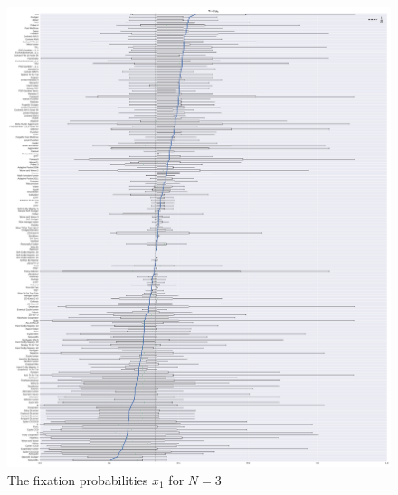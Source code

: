 \documentclass{article}
\begin{document}
\begin{figure}[!hbtp]
    \centering
    \includegraphics[height=.9\textheight]{./img/boxplot_3_invade.pdf}
    \caption{The fixation probabilities \(x_1\) for \(N=3\)}
    \label{fig:boxplot_3_invade}
\end{figure}
\end{document}
